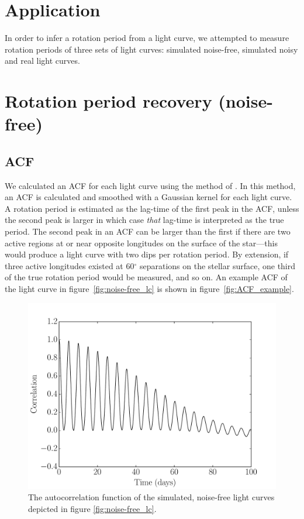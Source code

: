 \section{Application}

In order to infer a rotation period from a light curve, we attempted to
measure rotation periods of three sets of light curves: simulated noise-free,
simulated noisy and real light curves.

\section{Rotation period recovery (noise-free)}

\subsection{ACF}

We calculated an ACF for each light curve using the method of
\citet{mcquillan13}.
In this method, an ACF is calculated and smoothed with a Gaussian kernel for
each light curve.
A rotation period is estimated as the lag-time of the first peak in the ACF,
unless the second peak is larger in which case {\it that} lag-time is
interpreted as the true period.
The second peak in an ACF can be larger than the first if there are two active
regions at or near opposite longitudes on the surface of the star---this would
produce a light curve with two dips per rotation period.
By extension, if three active longitudes existed at 60$^\circ$ separations on
the stellar surface, one third of the true rotation period would be measured,
and so on.
An example ACF of the light curve in figure~\ref{fig:noise-free_lc} is shown
in figure~\ref{fig:ACF_example}.

\begin{figure}
\begin{center}
\includegraphics[width=6in, clip=true]{figures/noise-free_acf.pdf}
\caption{The autocorrelation function of the simulated, noise-free light
curves depicted in figure \ref{fig:noise-free_lc}.}
\end{center}
\end{figure}
\label{fig:compare_noise_free}


